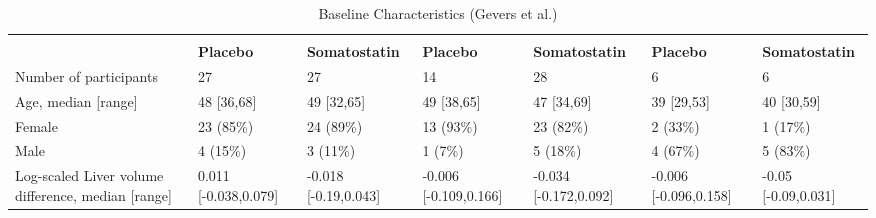 \documentclass[14pt,]{article}
\begin{document}
\begingroup\fontsize{8}{10}\selectfont

\begin{longtabu} to 
\caption{\label{tab:unnamed-chunk-1}Baseline Characteristics (Gevers et al.)}\\
\toprule
{} &  &  &  \\
\cmidrule(l{3pt}r{3pt}){2-3} \cmidrule(l{3pt}r{3pt}){4-5} \cmidrule(l{3pt}r{3pt}){6-7}
\textbf{ } & \textbf{Placebo} & \textbf{Somatostatin} & \textbf{Placebo} & \textbf{Somatostatin} & \textbf{Placebo} & \textbf{Somatostatin}\\
\midrule
{}  Number of participants & 27 & 27 & 14 & 28 & 6 & 6\\
Age, median [range] & 48 [36,68] & 49 [32,65] & 49 [38,65] & 47 [34,69] & 39 [29,53] & 40 [30,59]\\
  Female & 23 (85\%) & 24 (89\%) & 13 (93\%) & 23 (82\%) & 2 (33\%) & 1 (17\%)\\
Male & 4 (15\%) & 3 (11\%) & 1 (7\%) & 5 (18\%) & 4 (67\%) & 5 (83\%)\\
  Log-scaled Liver volume difference, median [range] & 0.011 [-0.038,0.079] & -0.018 [-0.19,0.043] & -0.006 [-0.109,0.166] & -0.034 [-0.172,0.092] & -0.006 [-0.096,0.158] & -0.05 [-0.09,0.031]\\
\bottomrule
\end{longtabu}
\endgroup{}
\end{document}
